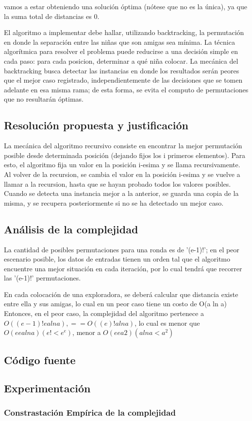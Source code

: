 vamos a estar obteniendo una solución óptima (nótese que no es la única), ya que la suma total de distancias es 0.

El algoritmo a implementar debe hallar, utilizando backtracking, la permutación en donde la separación entre las niñas que son amigas sea mínima. La técnica algorítmica para resolver el problema puede reducirse a una decisión simple en cada paso: para cada posicion, determinar a qué niña colocar. La mecánica del backtracking busca detectar las instancias en donde los resultados serán peores que el mejor caso registrado, independientemente de las decisiones que se tomen adelante en esa misma rama; de esta forma, se evita el computo de permutaciones que no resultarán óptimas.


\subsection{Resoluci\'on propuesta y justificaci\'on}
La mecánica del algoritmo recursivo consiste en encontrar la mejor permutación posible desde determinada posición (dejando fijos los i primeros elementos).
Para esto, el algoritmo fija un valor en la posición i-esima y se llama recursivamente. Al volver de la recursion, se cambia el valor en la posición i-esima y se vuelve a llamar a la recursion, hasta que se hayan probado todos los valores posibles.
Cuando se detecta una instancia mejor a la anterior, se guarda una copia de la misma, y se recupera posteriormente si no se ha detectado un mejor caso.
\subsection{An\'alisis de la complejidad}
La cantidad de posibles permutaciones para una ronda es de '(e-1)!'; en el peor escenario posible, los datos de entradas tienen un orden tal que el algoritmo encuentre una mejor situación en cada iteración, por lo cual tendrá que recorrer las '(e-1)!' permutaciones. 

En cada colocación de una exploradora, se deberá calcular que distancia existe entre ella y sus amigas, lo cual en un peor caso tiene un costo de O(a ln a)
Entonces, en el peor caso, la complejidad del algoritmo pertenece a $O( (e-1)! e a ln a), == O( (e)! a ln a)$,   lo cual es menor que $O(ee a lna) (e! < e^e)$, menor a  $O(ee a2) (a ln a < a^2)$
\subsection{C\'odigo fuente}
\subsection{Experimentaci\'on}

\subsubsection{Constrastaci\'on Emp\'irica de la complejidad}\label{tiempos}

